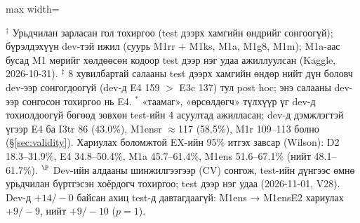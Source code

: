 \begin{table}[H]
\begin{adjustbox}{max width=\textwidth}
\end{adjustbox}
\par\smallskip\footnotesize $^\dagger$ Урьдчилан зарласан гол тохиргоо (test дээрх хамгийн өндрийг сонгоогүй); бүрэлдэхүүн
dev-тэй ижил (суурь M1rr + M1ks, M1a, M1g8, M1m); M1a-аас бусад M1 мөрийг хөлдөөсөн кодоор test дээр нэг удаа ажиллуулсан
(Kaggle, 2026-10-31). $^\ddagger$ 8 хувилбартай салааны test дээрх хамгийн өндөр нийт дүн боловч dev-ээр сонгогдоогүй
(dev-д E4 159 $>$ E3c 137) тул post hoc; энэ салааны dev-ээр сонгосон тохиргоо нь E4. $^\ast$ «таамаг», «өрсөлдөгч»
түлхүүр үг dev-д тохиолдоогүй бөгөөд зөвхөн test-ийн 4 асуултад ажилласан; dev-д дэмжлэгтэй үгээр E4 ба I3tr 86 (43.0\%),
M1ensr $\approx$117 (58.5\%), M1r 109--113 болно (§\ref{sec:validity}). Хариулах боломжтой EX-ийн 95\% итгэх завсар
(Wilson): D2 18.3--31.9\%, E4 34.8--50.4\%, M1a 45.7--61.4\%, M1ens 51.6--67.1\% (нийт 48.1--61.7\%).
$^\P$ Dev-ийн алдааны шинжилгээгээр (CV) сонгож, test-ийн дүнгээс өмнө урьдчилан бүртгэсэн хоёрдогч тохиргоо; test дээр нэг
удаа (2026-11-01, V28). Dev-д $+14/-0$ байсан ахиц test-д давтагдаагүй: M1ens → M1ensE2 хариулах $+9/-9$, нийт $+9/-10$ ($p = 1$).
\end{table}

